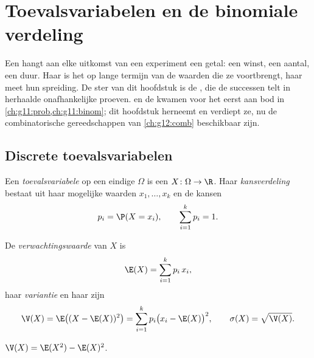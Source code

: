 \chapter{Toevalsvariabelen en de binomiale verdeling}\label{ch:g12:randvar}

Een  hangt aan elke uitkomst van een experiment een getal:
een winst, een aantal, een duur. Haar  is het  op
lange termijn van de waarden die ze voortbrengt, haar  meet hun
spreiding. De ster van dit hoofdstuk is de , die de
successen telt in herhaalde onafhankelijke proeven.  en de
 kwamen voor het eerst aan bod in
\cref{ch:g11:prob,ch:g11:binom}; dit hoofdstuk herneemt en verdiept ze, nu de
combinatorische gereedschappen van \cref{ch:g12:comb} beschikbaar zijn.

\section{Discrete toevalsvariabelen}

\begin{definition}\label{def:g12:randvar:rv}
Een \emph{toevalsvariabele} op een eindige
 $\Omega$ is een  $X \colon \Omega \to \R$. Haar
\emph{kansverdeling} bestaat uit haar mogelijke waarden
$x_1, \dots, x_k$ en de kansen
\[
p_i = \P(X = x_i), \qquad \sum_{i=1}^{k} p_i = 1 .
\]
\end{definition}

\begin{definition}\label{def:g12:randvar:exp}
De \emph{verwachtingswaarde} van $X$ is
\[
\E(X) = \sum_{i=1}^{k} p_i\, x_i ,
\]
haar \emph{variantie} en haar \emph{} zijn
\[
\V(X) = \E\bigl((X - \E(X))^2\bigr) = \sum_{i=1}^k p_i\bigl(x_i - \E(X)\bigr)^2,
\qquad
\sigma(X) = \sqrt{\V(X)} .
\]
\end{definition}

\begin{proposition}\label{prop:g12:randvar:konig}
$\V(X) = \E(X^2) - \E(X)^2$.
\end{proposition}

